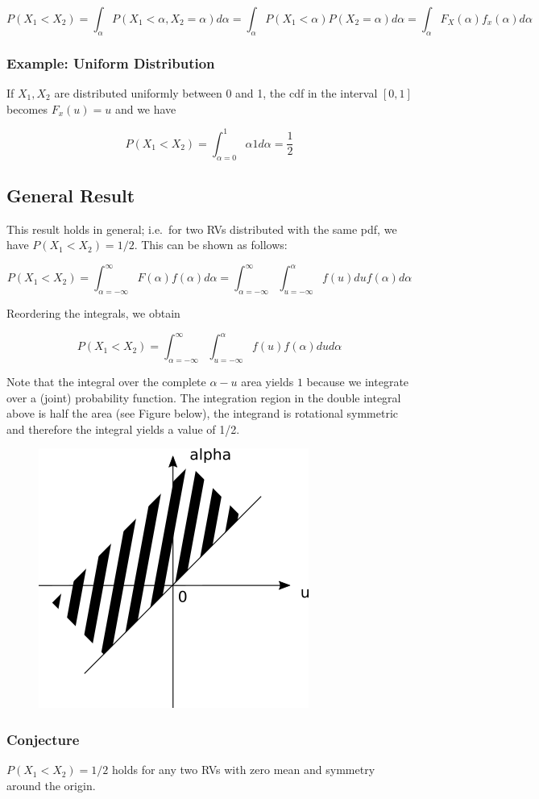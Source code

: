 \[
P(X_1 < X_2) = \int_\alpha P(X_1<\alpha, X_2=\alpha) d\alpha = \int_\alpha P(X_1<\alpha) P(X_2=\alpha) d\alpha = \int_\alpha F_X(\alpha) f_x(\alpha) d\alpha
\]

\subsubsection{Example: Uniform Distribution}

If \(X_1, X_2\) are distributed uniformly between 0 and 1, the cdf in
the interval \([0,1]\) becomes \(F_x(u) = u\) and we have

\[
P(X_1 < X_2) = \int_{\alpha=0}^1 \alpha 1 d\alpha = \frac{1}{2}
\]

\subsection{General Result}

This result holds in general; i.e.~for two RVs distributed with the same
pdf, we have \(P(X_1 < X_2) = 1/2\). This can be shown as follows:

\[
P(X_1 < X_2) = \int_{\alpha=-\infty}^\infty F(\alpha) f(\alpha) d\alpha = \int_{\alpha=-\infty}^\infty \int_{u=-\infty}^\alpha f(u) du f(\alpha) d\alpha
\]

Reordering the integrals, we obtain

\[
P(X_1 < X_2) = \int_{\alpha=-\infty}^\infty \int_{u=-\infty}^\alpha f(u) f(\alpha) du d\alpha
\]

Note that the integral over the complete \(\alpha - u\) area yields
\(1\) because we integrate over a (joint) probability function. The
integration region in the double integral above is half the area (see
Figure below), the integrand is rotational symmetric and therefore the
integral yields a value of 1/2.

\begin{figure}[H]
\includegraphics{images/rv_relation_2.png}
\end{figure}

\subsubsection{Conjecture}

$P(X_1 <  X_2) = 1/2$ holds for any two RVs with zero mean and symmetry around the origin.


